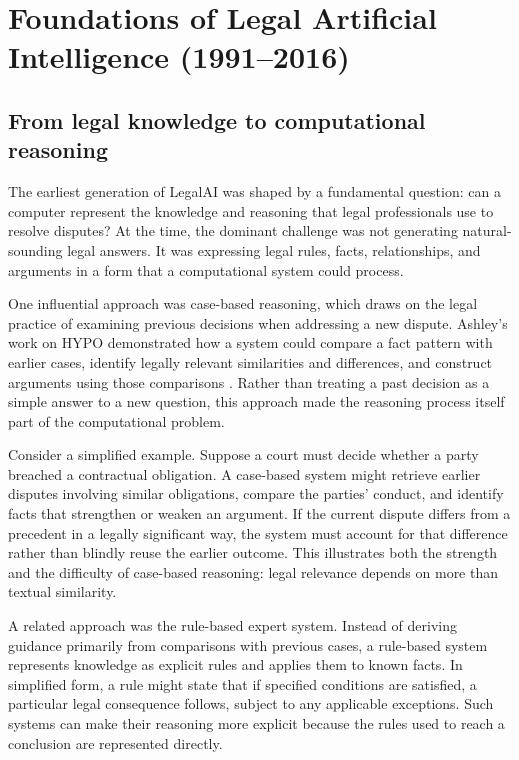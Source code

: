 \section{Foundations of Legal Artificial Intelligence (1991--2016)}
\label{sec:foundations}

\subsection{From legal knowledge to computational reasoning}

The earliest generation of LegalAI was shaped by a fundamental question: can a computer represent
the knowledge and reasoning that legal professionals use to resolve disputes? At the time, the
dominant challenge was not generating natural-sounding legal answers. It was expressing legal
rules, facts, relationships, and arguments in a form that a computational system could process.

One influential approach was case-based reasoning, which draws on the legal practice of examining
previous decisions when addressing a new dispute. Ashley's work on HYPO demonstrated how a system
could compare a fact pattern with earlier cases, identify legally relevant similarities and
differences, and construct arguments using those comparisons \citep{ashley1991}. Rather than
treating a past decision as a simple answer to a new question, this approach made the reasoning
process itself part of the computational problem.

Consider a simplified example. Suppose a court must decide whether a party breached a contractual
obligation. A case-based system might retrieve earlier disputes involving similar obligations,
compare the parties' conduct, and identify facts that strengthen or weaken an argument. If the
current dispute differs from a precedent in a legally significant way, the system must account for
that difference rather than blindly reuse the earlier outcome. This illustrates both the strength
and the difficulty of case-based reasoning: legal relevance depends on more than textual
similarity.

A related approach was the rule-based expert system. Instead of deriving guidance primarily from
comparisons with previous cases, a rule-based system represents knowledge as explicit rules and
applies them to known facts. In simplified form, a rule might state that if specified conditions
are satisfied, a particular legal consequence follows, subject to any applicable exceptions. Such
systems can make their reasoning more explicit because the rules used to reach a conclusion are
represented directly.


